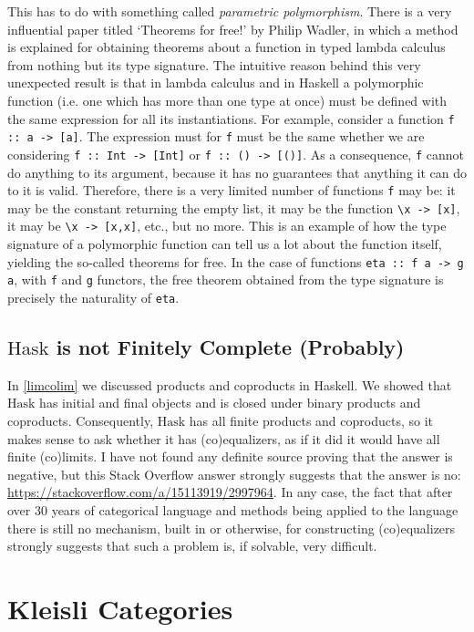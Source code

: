 \documentclass[11pt]{article}
\theoremstyle{nonumberplain}
\newcommand{\Hask}{\mathrm{Hask}}
\newcommand*\lsin{\lstinline}
\begin{document}
This has to do with something called \emph{parametric polymorphism}. There is a very influential paper titled `Theorems for free!' \cite{theoremsforfree} by Philip Wadler, in which a method is explained for obtaining theorems about a function in typed lambda calculus from nothing but its type signature. The intuitive reason behind this very unexpected result is that in lambda calculus and in Haskell a polymorphic function (i.e. one which has more than one type at once) must be defined with the same expression for all its instantiations. For example, consider a function \lsin|f :: a -> [a]|. The expression must for \lsin|f| must be the same whether we are considering \lsin|f :: Int -> [Int]| or \lsin|f :: () -> [()]|. As a consequence, \lsin|f| cannot do anything to its argument, because it has no guarantees that anything it can do to it is valid. Therefore, there is a very limited number of functions \lsin|f| may be: it may be the constant returning the empty list, it may be the function \lsin|\x -> [x]|, it may be \lsin|\x -> [x,x]|, etc., but no more. This is an example of how the type signature of a polymorphic function can tell us a lot about the function itself, yielding the so-called theorems for free. In the case of functions \lsin|eta :: f a -> g a|, with \lsin|f| and \lsin|g| functors, the free theorem obtained from the type signature is precisely the naturality of \lsin|eta|. \cite{parametric}

\subsection{\texorpdfstring{$\Hask$}{Hask} is not Finitely Complete (Probably)}

In \ref{limcolim} we discussed products and coproducts in Haskell. We showed that $\Hask$ has initial and final objects and is closed under binary products and coproducts. Consequently, $\Hask$ has all finite products and coproducts, so it makes sense to ask whether it has (co)equalizers, as if it did it would have all finite (co)limits. I have not found any definite source proving that the answer is negative, but this Stack Overflow answer strongly suggests that the answer is no: \url{https://stackoverflow.com/a/15113919/2997964}. In any case, the fact that after over 30 years of categorical language and methods being applied to the language there is still no mechanism, built in or otherwise, for constructing (co)equalizers strongly suggests that such a problem is, if solvable, very difficult.

\section{Kleisli Categories}
\end{document}
